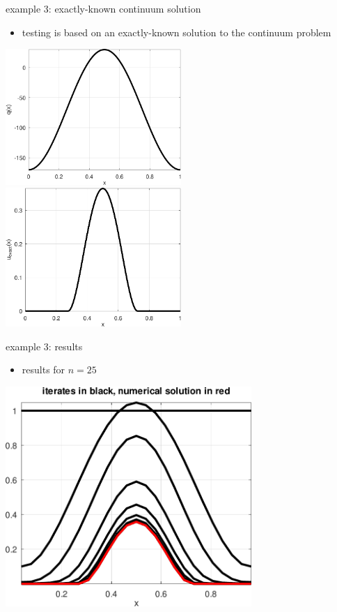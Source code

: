\documentclass[10pt,hyperref,dvipsnames]{beamer}
\begin{document}
\begin{frame}{example 3: exactly-known continuum solution}

\begin{itemize}
\item testing is based on an exactly-known solution to the continuum problem
\end{itemize}

\medskip
\noindent
\hspace{-5mm}
\mbox{\includegraphics[width=0.5\textwidth]{figs/qobstacle.pdf} \qquad \includegraphics[width=0.5\textwidth]{figs/uexactobstacle.pdf}}
\end{frame}


\begin{frame}{example 3: results}

\begin{itemize}
\item results for $n=25$
\end{itemize}

\medskip
\begin{center}
\includegraphics[width=0.7\textwidth]{figs/iteratesobstacle.pdf}
\end{center}
\end{frame}
\end{document}
